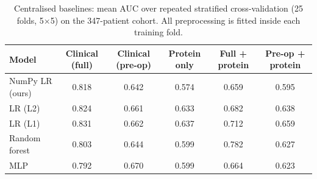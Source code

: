 \begin{table}[t]
\caption{Centralised baselines: mean AUC over repeated stratified cross-validation (25 folds, 5$\times$5) on the 347-patient cohort. All preprocessing is fitted inside each training fold.}
\centering\small
\begin{tabular}{lccccc}
\toprule
Model & Clinical (full) & Clinical (pre-op) & Protein only & Full + protein & Pre-op + protein \\
\midrule
NumPy LR (ours) & 0.818 & 0.642 & 0.574 & 0.659 & 0.595 \\
LR (L2) & 0.824 & 0.661 & 0.633 & 0.682 & 0.638 \\
LR (L1) & 0.831 & 0.662 & 0.637 & 0.712 & 0.659 \\
Random forest & 0.803 & 0.644 & 0.599 & 0.782 & 0.627 \\
MLP & 0.792 & 0.670 & 0.599 & 0.664 & 0.623 \\
\bottomrule
\end{tabular}
\label{tab:centralized}
\end{table}
